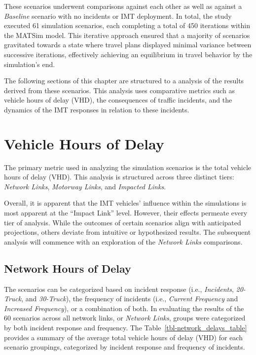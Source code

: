 \documentclass[fancy, oneside, mastersfancy, ms]{byuthesis}
\begin{document}
These scenarios underwent comparisons against each other as well as
against a \emph{Baseline} scenario with no incidents or IMT deployment.
In total, the study executed 61 simulation scenarios, each completing a
total of 450 iterations within the MATSim model. This iterative approach
ensured that a majority of scenarios gravitated towards a state where
travel plans displayed minimal variance between successive iterations,
effectively achieving an equilibrium in travel behavior by the
simulation's end.

The following sections of this chapter are structured to a analysis of
the results derived from these scenarios. This analysis uses comparative
metrics such as vehicle hours of delay (VHD), the consequences of
traffic incidents, and the dynamics of the IMT responses in relation to
these incidents.

\hypertarget{vehicle-hours-of-delay}{%
\section{Vehicle Hours of Delay}\label{vehicle-hours-of-delay}}

The primary metric used in analyzing the simulation scenarios is the
total vehicle hours of delay (VHD). This analysis is structured across
three distinct tiers: \emph{Network Links}, \emph{Motorway Links}, and
\emph{Impacted Links}.

Overall, it is apparent that the IMT vehicles' influence within the
simulations is most apparent at the ``Impact Link'' level. However,
their effects permeate every tier of analysis. While the outcomes of
certain scenarios align with anticipated projections, others deviate
from intuitive or hypothesized results. The subsequent analysis will
commence with an exploration of the \emph{Network Links} comparisons.

\hypertarget{network-hours-of-delay}{%
\subsection{Network Hours of Delay}\label{network-hours-of-delay}}

The scenarios can be categorized based on incident response (i.e.,
\emph{Incidents}, \emph{20-Truck}, and \emph{30-Truck}), the frequency
of incidents (i.e., \emph{Current Frequency} and \emph{Increased
Frequency}), or a combination of both. In evaluating the results of the
60 scenarios across all network links, or \emph{Network Links}, groups
were categorized by both incident response and frequency. The
Table~\ref{tbl-network_delays_table} provides a summary of the average
total vehicle hours of delay (VHD) for each scenario groupings,
categorized by incident response and frequency of incidents.
\end{document}
